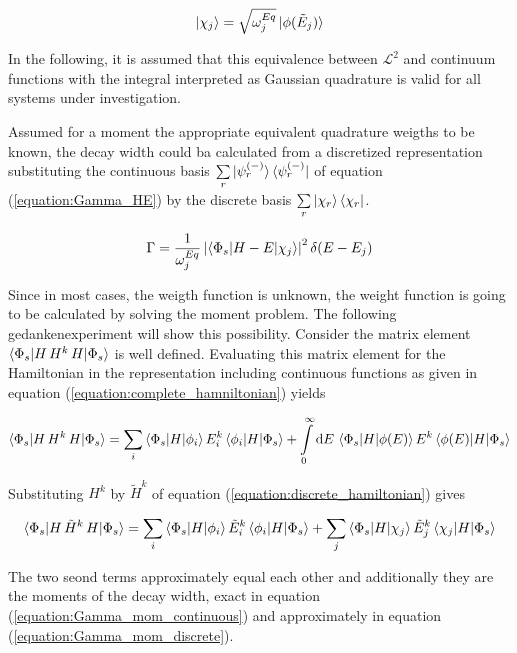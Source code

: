 \begin{equation}
  \ket{\chi_j} = \sqrt{\omega_j^{Eq}} \ket{\phi(\tilde{E}_j)}
\end{equation}

In the following, it is assumed that this equivalence between $\mathcal{L}^2$
and continuum functions with the integral interpreted as Gaussian quadrature
is valid for all systems under investigation.

Assumed for a moment the appropriate equivalent quadrature
weigths to be known, the decay width could ba calculated from a
discretized representation substituting the continuous basis
$\sum\limits_{r} \ket{\psi_r^{(-)}} \bra{\psi_r^{(-)}}$ of
equation (\ref{equation:Gamma_HE}) by the discrete basis
$\sum\limits_{r} \ket{\chi_r} \bra{\chi_r}$.

\begin{equation} \label{equation:gamma_moments}
  \Gamma = \frac 1{\omega_{j}^{Eq}} \left| \braket{\Phi_s|H-E|\chi_j} \right|^2
           \delta(E-E_j)
\end{equation}

Since in most cases, the weigth function is unknown, the weight function
is going to be calculated by solving the moment problem.
The following gedankenexperiment will show this possibility.
Consider the matrix element $\braket{\Phi_s|H\,H^k\,H|\Phi_s}$ is well defined.
Evaluating this matrix element for the Hamiltonian in the representation including
continuous functions as given in equation (\ref{equation:complete_hamniltonian})
yields

\begin{equation}    \label{equation:Gamma_mom_continuous}
 \braket{\Phi_s|H\,H^k\,H|\Phi_s} = \sum\limits_i \braket{\Phi_s|H|\phi_i}E_i^k
                                    \braket{\phi_i|H|\Phi_s}
   + \int\limits_0^\infty \mathrm{d}E \, \braket{\Phi_s|H|\phi(E)} E^k
     \braket{\phi(E)|H|\Phi_s}
\end{equation}

Substituting $H^k$ by $\tilde{H}^k$ of equation (\ref{equation:discrete_hamiltonian})
gives

\begin{equation}  \label{equation:Gamma_mom_discrete}
 \braket{\Phi_s|H\,\tilde{H}^k\,H|\Phi_s} =
   \sum\limits_i \braket{\Phi_s|H|\phi_i}\tilde{E}_i^k
     \braket{\phi_i|H|\Phi_s}
   + \sum\limits_j \braket{\Phi_s|H|\chi_j} \tilde{E}_j^k
     \braket{\chi_j|H|\Phi_s}
\end{equation}

The two seond terms approximately equal each other and additionally
they are the moments of the decay width, exact in equation
(\ref{equation:Gamma_mom_continuous})
and approximately in equation (\ref{equation:Gamma_mom_discrete}).

